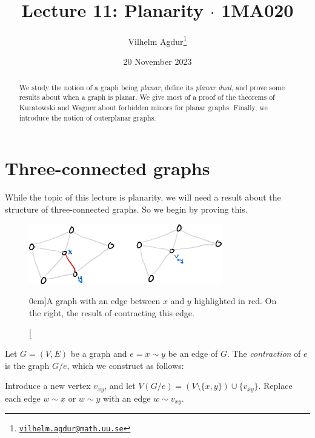 \documentclass[nobib]{tufte-handout}
\title{Lecture 11: Planarity $\cdot$ 1MA020}
\author[Vilhelm Agdur]{Vilhelm Agdur\thanks{\href{mailto:vilhelm.agdur@math.uu.se}{\nolinkurl{vilhelm.agdur@math.uu.se}}}}
\date{20 November 2023}
\begin{document}
\maketitle%

\begin{abstract}
\noindent
We study the notion of a graph being \emph{planar}, define its \emph{planar dual}, and prove some results about when a graph is planar. We give most of a proof of the theorems of Kuratowski and Wagner about forbidden minors for planar graphs. Finally, we introduce the notion of outerplanar graphs.
\end{abstract}

\section{Three-connected graphs}

While the topic of this lecture is planarity, we will need a result about the structure of three-connected graphs. So we begin by proving this.

\begin{figure}
  \centering
  \includegraphics[width=0.75\textwidth]{graphics/L10_connectivity/edge_contraction.png}
  \caption[][0cm]{A graph with an edge between $x$ and $y$ highlighted in red. On the right, the result of contracting this edge.}
  \label{fig:edge_contraction}
\end{figure}

\begin{definition}
  Let $G = (V,E)$ be a graph and $e = x\sim y$ be an edge of $G$. The \emph{contraction} of $e$ is the graph $G/e$, which we construct as follows:

  Introduce a new vertex $v_{xy}$, and let $V(G/e) = (V \setminus \{x,y\}) \cup \{v_{xy}\}$. Replace each edge $w \sim x$ or $w \sim y$ with an edge $w \sim v_{xy}$.
\end{definition}
\end{document}
